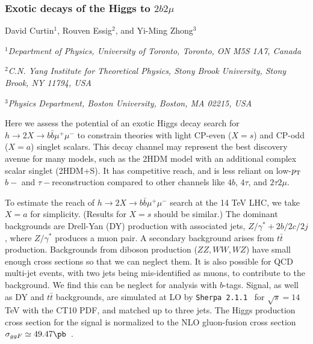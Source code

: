


\subsubsection{Exotic  decays of the Higgs to $2b2\mu$}
\begin{center}
 {David Curtin$^{1}$, Rouven Essig$^{2}$, and Yi-Ming Zhong$^{3}$\\
}
\centerline{{\it $^{1}$Department of Physics, University of Toronto, Toronto, ON M5S 1A7, Canada}}
\centerline{{\it  $^{2}$C.N. Yang Institute for Theoretical Physics, Stony Brook University, Stony Brook, NY 11794, USA}}
\centerline{{\it  $^{3}$Physics Department, Boston University, Boston, MA 02215, USA}}
\end{center}
Here we assess the potential of an exotic Higgs decay search for $h \to 2X \to b\bar{b}\mu^+ \mu^-$ to constrain theories with light CP-even ($X = s$) and CP-odd ($X = a$) singlet scalars.  This decay channel may represent the best discovery avenue for many models, such as the 2HDM model with an additional complex scalar singlet (2HDM+S). It has competitive reach, and is less reliant on low-$p_{\rm T}$ $b-$ and $\tau-$reconstruction compared to other channels like $4b$, $4\tau$, and $2\tau2\mu$. 


To estimate the reach of $h \to 2X \to b\bar{b}\mu^+ \mu^-$ search at the 14 TeV LHC, we take $X =a$ for simplicity. (Results for $X=s$ should be similar.) The dominant backgrounds are Drell-Yan (DY) production with associated jets, \ie $Z/\gamma^*+2b/2c/2j$, where $Z/\gamma^*$ produces a muon pair. A secondary background arises from $t\bar t$ production. Backgrounds from diboson production ($ZZ, WW, WZ$) have small enough cross sections so that we can neglect them. It is also possible for QCD multi-jet events, with two jets being mis-identified as muons, to contribute to the background. We find this can be neglect for analysis with $b$-tags. Signal, as well as DY and $t\bar t$ backgrounds, are simulated at LO by \texttt{Sherpa 2.1.1}~\cite{Gleisberg:2008ta} for $\sqrt{s}=14$ TeV with the CT10 PDF, and matched up to three jets. The Higgs production cross section for the signal is normalized to the NLO gluon-fusion cross section $\sigma_{ggF} \simeq 49.47 \pb$~\cite{Dittmaier:2011ti}.  



